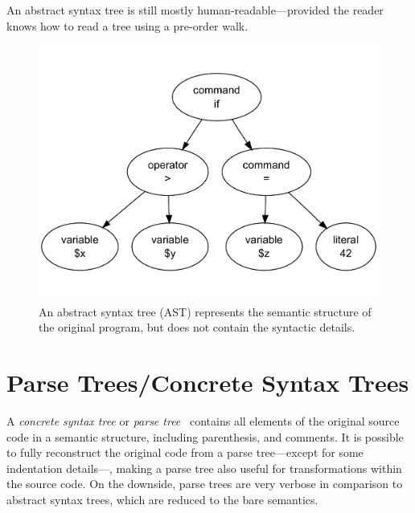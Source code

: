 
An abstract syntax tree is still mostly human-readable---provided the reader knows how to read a tree using a pre-order walk.

\begin{figure}[htb]
  \begin{center}
    \includegraphics[scale=0.4]{images/ast}
    \caption{An abstract syntax tree (AST) represents the semantic structure of the original program, but does not contain the syntactic details.}
    \label{fig:ast}
  \end{center}
\end{figure}



\section{Parse Trees/Concrete Syntax Trees}
\label{parse-tree}

A \emph{concrete syntax tree} or \emph{parse tree}~\cite{compiler-construction, compilers} contains all elements of the original source code in a semantic structure, including parenthesis, and comments. It is possible to fully reconstruct the original code from a parse tree---except for some indentation details---, making a parse tree also useful for transformations within the source code. On the downside, parse trees are very verbose in comparison to abstract syntax trees, which are reduced to the bare semantics.

